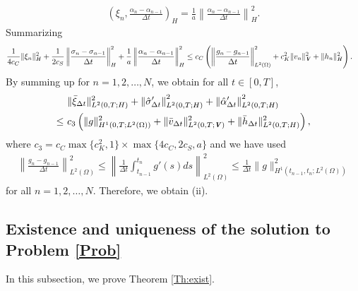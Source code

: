 \documentclass[11pt, a4paper]{article}
\newcommand{\dt}{{\Delta t}}
\newcommand{\bm}[1]{\textbf{\textit{#1}}}%
\newcommand{\Vv}{{\bm{V}}}
\newcommand{\Hs}{{H}}
\begin{document}
\begin{align*}
    \left(\xi_n, \frac{\alpha_n - \alpha_{n-1}}{\dt}\right)_\Hs
    = \frac{1}{a}\left\|\frac{\alpha_n - \alpha_{n-1}}{\dt}\right\|_\Hs^2.
\end{align*}
Summarizing
\begin{align*}
    &\frac{1}{4c_C}\|\xi_n\|_\Hs^2 
    + \frac{1}{2c_S}\left\|\frac{\sigma_n - \sigma_{n-1}}{\dt}\right\|_\Hs^2
    + \frac{1}{a}\left\|\frac{\alpha_n - \alpha_{n-1}}{\dt}\right\|_\Hs^2
    \le c_C\left(\left\|\frac{g_n - g_{n-1}}{\dt}\right\|_{L^2(\Omega)}^2
    + c_K^2\|v_n\|_\Vv^2 + \|h_n\|_\Hs^2\right).
\end{align*}
By summing up for $n = 1,2,\ldots,N$, we obtain for all $t\in[0,T]$,
\begin{align*}\begin{aligned}
    &\|\bar{\xi}_\dt\|_{L^2(0,T;\Hs)}^2 
    + \left\|\hat{\sigma}'_\dt\right\|_{L^2(0,T;\Hs)}^2
    + \left\|\hat{\alpha}'_\dt\right\|_{L^2(0,T;\Hs)}^2\\
    \le~& c_3\left(\|g\|_{H^1(0,T;L^2(\Omega))}^2
    + \|\bar{v}_\dt\|_{L^2(0,T;\Vv)}^2 
    + \|\bar{h}_\dt\|_{L^2(0,T;\Hs)}^2\right),
\end{aligned}\end{align*}
where $c_3=c_C\max\{c_K^2,1\}\times\max\{4c_C,2c_S,a\}$ and we have used
\begin{align*}
    \left\|\frac{g_n - g_{n-1}}{\dt}\right\|_{L^2(\Omega)}^2
    \le \left\|\frac{1}{\dt}\int_{t_{n-1}}^{t_n}g'(s)ds\right\|_{L^2(\Omega)}^2
    \le \frac{1}{\dt}\|g\|_{H^1(t_{n-1},t_n;L^2(\Omega))}^2
\end{align*}
for all $n=1,2,\ldots,N$. Therefore, we obtain (ii).

\subsection{Existence and uniqueness of the solution to Problem \ref{Prob}}

In this subsection, we prove Theorem \ref{Th:exist}.
\end{document}
